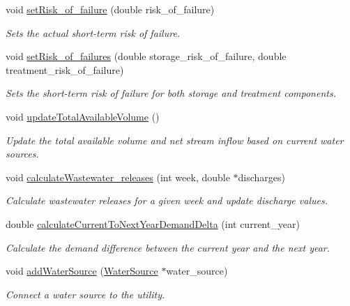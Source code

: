\begin{DoxyCompactItemize}
void \mbox{\hyperlink{classUtility_a68d5088951f6bdccbb7af18ea8f153f5}{set\+Risk\+\_\+of\+\_\+failure}} (double risk\+\_\+of\+\_\+failure)
\begin{DoxyCompactList}\small\item\em Sets the actual short-\/term risk of failure. \end{DoxyCompactList}\item 
void \mbox{\hyperlink{classUtility_aadf42161486c8305b0b55aa65c5f519e}{set\+Risk\+\_\+of\+\_\+failures}} (double storage\+\_\+risk\+\_\+of\+\_\+failure, double treatment\+\_\+risk\+\_\+of\+\_\+failure)
\begin{DoxyCompactList}\small\item\em Sets the short-\/term risk of failure for both storage and treatment components. \end{DoxyCompactList}\item 
void \mbox{\hyperlink{classUtility_af394fe9f04a371a7cf10ddadba575e85}{update\+Total\+Available\+Volume}} ()
\begin{DoxyCompactList}\small\item\em Update the total available volume and net stream inflow based on current water sources. \end{DoxyCompactList}\item 
void \mbox{\hyperlink{classUtility_a5feecc73d561de022eb6ba3c657b3dbc}{calculate\+Wastewater\+\_\+releases}} (int week, double $\ast$discharges)
\begin{DoxyCompactList}\small\item\em Calculate wastewater releases for a given week and update discharge values. \end{DoxyCompactList}\item 
double \mbox{\hyperlink{classUtility_a38381b003d13986e37757dfea683f7f9}{calculate\+Current\+To\+Next\+Year\+Demand\+Delta}} (int current\+\_\+year)
\begin{DoxyCompactList}\small\item\em Calculate the demand difference between the current year and the next year. \end{DoxyCompactList}\item 
void \mbox{\hyperlink{classUtility_aebbfd65c13e86cfeda8bdfbcc6712587}{add\+Water\+Source}} (\mbox{\hyperlink{classWaterSource}{Water\+Source}} $\ast$water\+\_\+source)
\begin{DoxyCompactList}\small\item\em Connect a water source to the utility. \end{DoxyCompactList}\item 

\end{DoxyCompactItemize}
